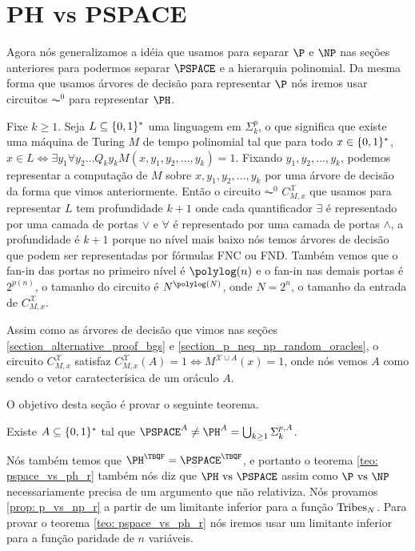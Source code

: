 \section{PH vs PSPACE}

Agora nós generalizamos a idéia que usamos para separar $\P$ e $\NP$ nas seções anteriores para podermos separar $\PSPACE$ e a hierarquia polinomial. Da mesma forma que usamos árvores de decisão para representar $\P$ nós iremos usar circuitos $\AC^{0}$ para representar $\PH$.

Fixe $k \geq 1$. Seja $L \subseteq \{0, 1\}^{*}$ uma linguagem em $\Sigma_{k}^{p}$, o que significa que existe uma máquina de Turing $M$ de tempo polinomial tal que para todo $x \in \{0, 1\}^{*}$, $x \in L \iff \exists y_{1} \forall y_{2} \dots Q_{k} y_{k} M(x, y_{1}, y_{2}, \dots, y_{k}) = 1$. Fixando ${y}_{1}, y_{2}, \dots, y_{k}$, podemos representar a computação de $M$ sobre $x, {y}_{1}, y_{2}, \dots, y_{k}$ por uma árvore de decisão da forma que vimos anteriormente. Então o circuito $\AC^{0}$ $C_{M, x}^{\mathcal{X}}$ que usamos para representar $L$ tem profundidade $k + 1$ onde cada quantificador $\exists$ é representado por uma camada de portas $\lor$ e $\forall$ é representado por uma camada de portas $\land$, a profundidade é $k + 1$ porque no nível mais baixo nós temos árvores de decisão que podem ser representadas por fórmulas FNC ou FND. Também vemos que o fan-in das portas no primeiro nível é $\polylog(n)$ e o fan-in nas demais portas é $2^{p(n)}$, o tamanho do circuito é $N^{\polylog(N)}$, onde $N = 2^{n}$, o tamanho da entrada de $C_{M, x}^{\mathcal{X}}$.

Assim como as árvores de decisão que vimos nas seções \ref{section_alternative_proof_bgs} e \ref{section_p_neq_np_random_oracles}, o circuito $C_{M, x}^{\mathcal{X}}$ satisfaz $C_{M, x}^{\mathcal{X}}(A) = 1 \iff M^{\mathcal{X} \cup A}(x) = 1$, onde nós vemos $A$ como sendo o vetor caratecterísica de um oráculo $A$.

O objetivo desta seção é provar o seguinte teorema.

\begin{teo} \label{teo: pspace_vs_ph_r}

Existe $A \subseteq \{0, 1\}^{*}$ tal que $\PSPACE^{A} \neq \PH^{A} = \bigcup_{k \geq 1} \Sigma_{k}^{p, A}$.

\end{teo}

Nós também temos que $\PH^{\TBQF} = \PSPACE^{\TBQF}$, e portanto o teorema \ref{teo: pspace_vs_ph_r} também nós diz que $\PH \text{ vs } \PSPACE$ assim como $\P \text{ vs } \NP$ necessariamente precisa de um argumento que não relativiza. Nós provamos \ref{prop: p_vs_np_r} a partir de um limitante inferior para a função $\text{Tribes}_{N}$. Para provar o teorema \ref{teo: pspace_vs_ph_r} nós iremos usar um limitante inferior para a função paridade de $n$ variáveis.

